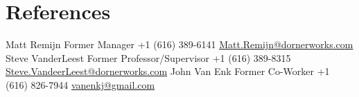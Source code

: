 \documentclass[print]{template/friggeri-cv} %
\begin{document}
\section{References}

\begin{entrylist}
\nodateentry
{Matt Remijn}
{Former Manager}
{+1 (616) 389-6141 \href{mailto:Matt.Remijn@dornerworks.com}{Matt.Remijn@dornerworks.com}}
\nodateentry
{Steve VanderLeest}
{Former Professor/Supervisor}
{+1 (616) 389-8315 \href{mailto:Steve.VanderLeest@dornerworks.com}{Steve.VandeerLeest@dornerworks.com}}
\nodateentry
{John Van Enk}
{Former Co-Worker}
{+1 (616) 826-7944 \href{mailto:vanenkj@gmail.com}{vanenkj@gmail.com}}
\end{entrylist}









\end{document}
